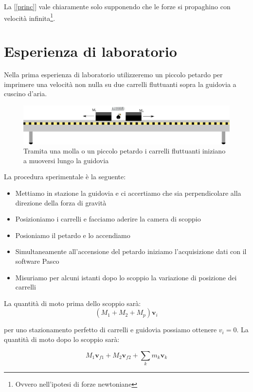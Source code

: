 \documentclass[a4paper,10pt,oneside]{article}
\begin{document}
La [\ref{princ}] vale chiaramente solo supponendo che le forze si propaghino con velocità infinita\footnote{Ovvero nell'ipotesi di forze newtoniane}.


\section{Esperienza di laboratorio}

Nella prima esperienza di laboratorio utilizzeremo un piccolo petardo per imprimere una velocità non nulla su due carrelli fluttuanti sopra la guidovia a cuscino d'aria.
\begin{figure}[H]
 \centering
 \includegraphics[width=\textwidth]{./Immagini/text5895-9.png}
 \caption{Tramita una molla o un piccolo petardo i carrelli fluttuanti iniziano a muoversi lungo la guidovia}
 \label{fig:esplosione}
\end{figure}

La procedura sperimentale è la seguente:
\begin{itemize}
 \item Mettiamo in stazione la guidovia e ci accertiamo che sia perpendicolare alla direzione della forza di gravità
\item Posizioniamo i carrelli e facciamo aderire la camera di scoppio
\item Posioniamo il petardo e lo accendiamo
\item Simultaneamente all'accensione del petardo iniziamo l'acquisizione dati con il software Pasco
\item Misuriamo per alcuni istanti dopo lo scoppio la variazione di posizione dei carrelli
\end{itemize}

La quantità di moto prima dello scoppio sarà:
\begin{equation}\label{cons_1}
 (M_1+M_2+M_p)\mathbf{v}_i
\end{equation}

per uno stazionamento perfetto di carrelli e guidovia possiamo ottenere $v_i=0$.
La quantità di moto dopo lo scoppio sarà:

\begin{equation}\label{cons_2}
 M_1\mathbf{v}_{f1}+M_2\mathbf{v}_{f2}+\sum_km_k\mathbf{v}_k
\end{equation}
\end{document}
